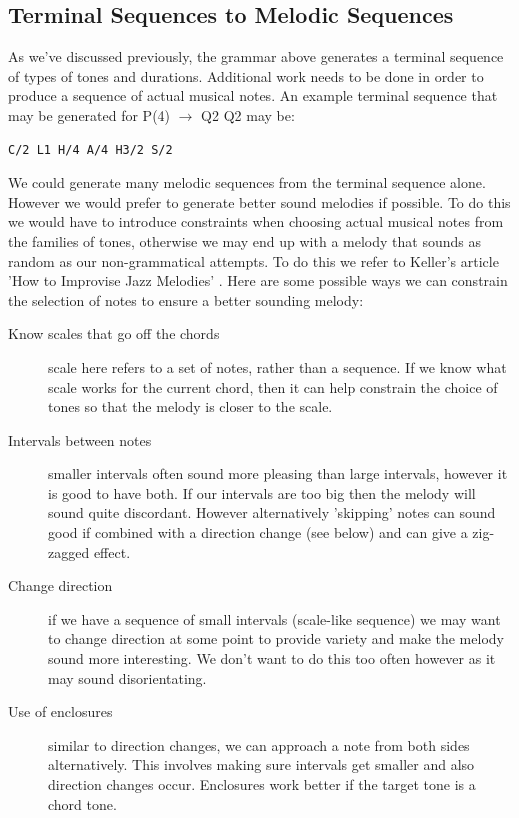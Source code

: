 \documentclass[pdftex,12pt,a4paper]{report}
\begin{document}
\subsection{Terminal Sequences to Melodic Sequences}
As we've discussed previously, the grammar above generates a terminal sequence of types of tones and durations. Additional work needs to be done in order to produce a sequence of actual musical notes. An example terminal sequence that may be generated for P(4) $\rightarrow$ Q2 Q2 may be:

\begin{verbatim}
C/2 L1 H/4 A/4 H3/2 S/2
\end{verbatim}

We could generate many melodic sequences from the terminal sequence alone. However we would prefer to generate better sound melodies if possible. To do this we would have to introduce constraints when choosing actual musical notes from the families of tones, otherwise we may end up with a melody that sounds as random as our non-grammatical attempts. To do this we refer to Keller's article 'How to Improvise Jazz Melodies' \cite{jazzkeller}. Here are some possible ways we can constrain the selection of notes to ensure a better sounding melody:

\begin{description}
  \item[Know scales that go off the chords] scale here refers to a set of notes, rather than a sequence. If we know what scale works for the current chord, then it can help constrain the choice of tones so that the melody is closer to the scale.
  \item[Intervals between notes] smaller intervals often sound more pleasing than large intervals, however it is good to have both. If our intervals are too big then the melody will sound quite discordant. However alternatively 'skipping' notes can sound good if combined with a direction change (see below) and can give a zig-zagged effect.
  \item[Change direction] if we have a sequence of small intervals (scale-like sequence) we may want to change direction at some point to provide variety and make the melody sound more interesting. We don't want to do this too often however as it may sound disorientating.
  \item[Use of enclosures] similar to direction changes, we can approach a note from both sides alternatively. This involves making sure intervals get smaller and also direction changes occur. Enclosures work better if the target tone is a chord tone.
\end{description}
\end{document}
